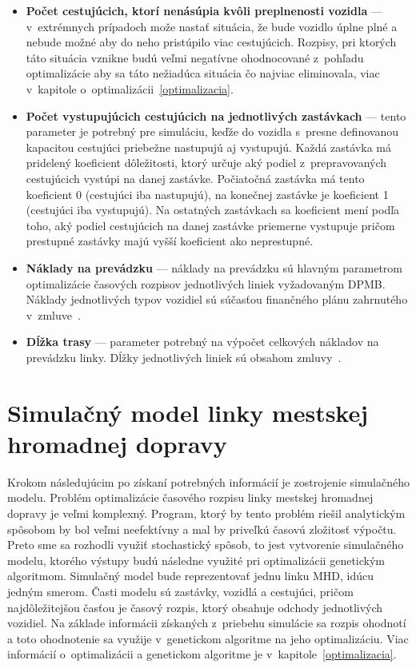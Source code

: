\begin{itemize}
  \item \textbf{Počet cestujúcich, ktorí nenásúpia kvôli preplnenosti vozidla} --- v~extrémnych prípadoch može nastať situácia, že bude vozidlo úplne plné a nebude možné aby do neho pristúpilo viac cestujúcich. Rozpisy, pri ktorých táto situácia vznikne budú veľmi negatívne ohodnocované z~pohľadu optimalizácie aby sa táto nežiadúca situácia čo najviac eliminovala, viac v~kapitole o~optimalizácii~\ref{optimalizacia}.
  \item \textbf{Počet vystupujúcich cestujúcich na jednotlivých zastávkach} --- tento parameter je potrebný pre simuláciu, keďže do vozidla s~presne definovanou kapacitou cestujúci priebežne nastupujú aj vystupujú. Každá zastávka má pridelený koeficient dôležitosti, ktorý určuje aký podiel z~prepravovaných cestujúcich vystúpi na danej zastávke. Počiatočná zastávka má tento koeficient 0 (cestujúci iba nastupujú), na konečnej zastávke je koeficient 1 (cestujúci iba vystupujú). Na ostatných zastávkach sa koeficient mení podľa toho, aký podiel cestujúcich na danej zastávke priemerne vystupuje pričom prestupné zastávky majú vyšší koeficient ako neprestupné.
  \item \textbf{Náklady na prevádzku} --- náklady na prevádzku sú hlavným parametrom optimalizácie časových rozpisov jednotlivých liniek vyžadovaným DPMB. Náklady jednotlivých typov vozidiel sú súčasťou finančného plánu zahrnutého v~zmluve~\cite{brno_dpmb_smlouva_2023}.
  \item \textbf{Dĺžka trasy} --- parameter potrebný na výpočet celkových nákladov na prevádzku linky. Dĺžky jednotlivých liniek sú obsahom zmluvy~\cite{brno_dpmb_smlouva_2023}.
\end{itemize}

\chapter{Simulačný model linky mestskej hromadnej dopravy}\label{simulacny_model}

Krokom následujúcim po získaní potrebných informácií je zostrojenie simulačného modelu.
Problém optimalizácie časového rozpisu linky mestskej hromadnej dopravy je veľmi komplexný.
Program, ktorý by tento problém riešil analytickým spôsobom by bol veľmi neefektívny a mal by priveľkú časovú zložitosť výpočtu.
Preto sme sa rozhodli využiť stochastický spôsob, to jest vytvorenie simulačného modelu, ktorého výstupy budú následne využité pri optimalizácii genetickým algoritmom.
Simulačný model bude reprezentovať jednu linku MHD, idúcu jedným smerom.
Časti modelu sú zastávky, vozidlá a cestujúci, pričom najdôležitejšou časťou je časový rozpis, ktorý obsahuje odchody jednotlivých vozidiel.
Na základe informácii získaných z~priebehu simulácie sa rozpis ohodnotí a toto ohodnotenie sa využije v~genetickom algoritme na jeho optimalizáciu.
Viac informácií o~optimalizácii a genetickom algoritme je v~kapitole~\ref{optimalizacia}.

